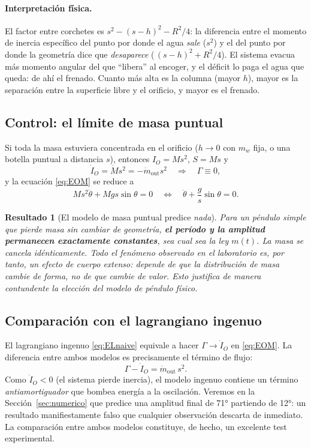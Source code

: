 \documentclass[11pt,a4paper]{article}
\newtheorem{resultado}{Resultado}
\begin{document}
\paragraph{Interpretación física.} El factor entre corchetes es $s^2-(s-h)^2-R^2/4$: la diferencia
entre el momento de inercia específico del punto por donde el agua \emph{sale} ($s^2$) y el del
punto por donde la geometría dice que \emph{desaparece} ($\,(s-h)^2+R^2/4$). El sistema evacua más
momento angular del que ``libera'' al encoger, y el déficit lo paga el agua que queda: de ahí el
frenado. Cuanto más alta es la columna (mayor $h$), mayor es la separación entre la superficie
libre y el orificio, y mayor es el frenado.

\subsection{Control: el límite de masa puntual}
\label{sec:puntual}

Si toda la masa estuviera concentrada en el orificio ($h\to 0$ con $m_w$ fija, o una botella
puntual a distancia $s$), entonces $I_O=Ms^2$, $S=Ms$ y
\begin{equation}
\dot I_O = \dot M s^2 = -\dot m_{\text{out}}s^2
\quad\Longrightarrow\quad \Gamma \equiv 0 ,
\end{equation}
y la ecuación \eqref{eq:EOM} se reduce a
\begin{equation}
M s^2\ddot\theta + Mgs\sin\theta = 0
\quad\Longleftrightarrow\quad
\ddot\theta + \frac{g}{s}\sin\theta = 0 .
\end{equation}

\begin{resultado}[El modelo de masa puntual predice \emph{nada}]
Para un péndulo simple que pierde masa sin cambiar de geometría, \textbf{el período y la amplitud
permanecen exactamente constantes}, sea cual sea la ley $m(t)$. La masa se cancela idénticamente.
Todo el fenómeno observado en el laboratorio es, por tanto, un efecto de \emph{cuerpo extenso}:
depende de que la distribución de masa cambie de \emph{forma}, no de que cambie de \emph{valor}.
Esto justifica de manera contundente la elección del modelo de péndulo físico.
\end{resultado}

\subsection{Comparación con el lagrangiano ingenuo}

El lagrangiano ingenuo \eqref{eq:ELnaive} equivale a hacer $\Gamma\to\dot I_O$ en \eqref{eq:EOM}.
La diferencia entre ambos modelos es precisamente el término de flujo:
\begin{equation}
\Gamma - \dot I_O = \dot m_{\text{out}}\,s^2 .
\end{equation}
Como $\dot I_O<0$ (el sistema pierde inercia), el modelo ingenuo contiene un término
\emph{antiamortiguador} que bombea energía a la oscilación. Veremos en la
Sección~\ref{sec:numerico} que predice una amplitud final de \ang{71} partiendo de \ang{12}:
un resultado manifiestamente falso que cualquier observación descarta de inmediato. La
comparación entre ambos modelos constituye, de hecho, un excelente test experimental.
\end{document}
